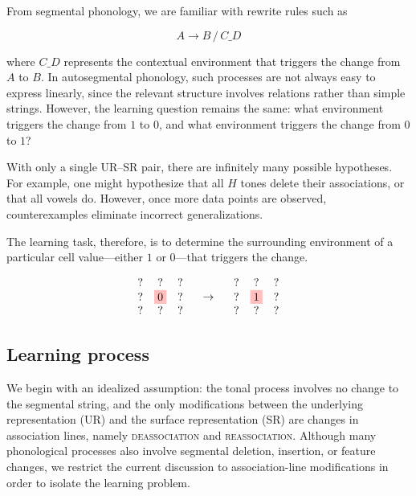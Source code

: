 \documentclass{article}[12pt]
\begin{document}
From segmental phonology, we are familiar with rewrite rules such as

\[
A \rightarrow B \,/\, C \_ D
\]

where \(C \_ D\) represents the contextual environment that triggers
the change from \(A\) to \(B\). In autosegmental phonology, such
processes are not always easy to express linearly, since the relevant
structure involves relations rather than simple strings. However, the
learning question remains the same: what environment triggers the
change from \(1\) to \(0\), and what environment triggers the change
from \(0\) to \(1\)?

With only a single UR--SR pair, there are infinitely many possible
hypotheses. For example, one might hypothesize that all \(H\) tones
delete their associations, or that all vowels do. However, once more
data points are observed, counterexamples eliminate incorrect
generalizations.

The learning task, therefore, is to determine the surrounding
environment of a particular cell value—either \(1\) or \(0\)—that
triggers the change.

\[
\begin{array}{ccc}
? & ? & ? \\
? & \colorbox{pink}{0} & ? \\
? & ? & ?
\end{array}
\quad \rightarrow \quad
\begin{array}{ccc}
? & ? & ? \\
? & \colorbox{pink}{1} & ? \\
? & ? & ?
\end{array}
\]

\subsection{Learning process}

We begin with an idealized assumption: the tonal process involves no
change to the segmental string, and the only modifications between the
underlying representation (UR) and the surface representation (SR) are
changes in association lines, namely \textsc{deassociation} and
\textsc{reassociation}. Although many phonological processes also
involve segmental deletion, insertion, or feature changes, we restrict
the current discussion to association-line modifications in order to
isolate the learning problem.
\end{document}
